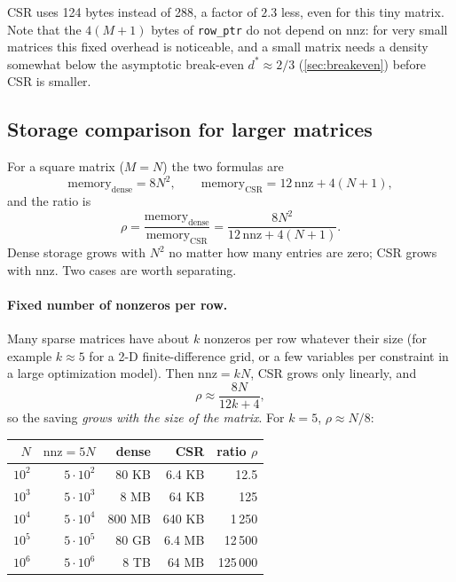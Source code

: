 \documentclass[11pt,a4paper]{article}
\newcommand{\id}[1]{\texttt{#1}}
\newcommand{\nnz}{\mathrm{nnz}}
\begin{document}
\noindent CSR uses 124 bytes instead of 288, a factor of $2.3$ less, even for
this tiny matrix. Note that the $4(M+1)$ bytes of \id{row\_ptr} do not depend
on $\nnz$: for very small matrices this fixed overhead is noticeable, and a
small matrix needs a density somewhat below the asymptotic break-even
$d^* \approx 2/3$ (\cref{sec:breakeven}) before CSR is smaller.

\subsection{Storage comparison for larger matrices}
\label{sec:storage-comparison}

For a square matrix ($M = N$) the two formulas are
\[
  \text{memory}_{\text{dense}} = 8N^2,
  \qquad
  \text{memory}_{\text{CSR}} = 12\,\nnz + 4(N+1),
\]
and the ratio is
\[
  \rho = \frac{\text{memory}_{\text{dense}}}{\text{memory}_{\text{CSR}}}
       = \frac{8N^2}{12\,\nnz + 4(N+1)} .
\]
Dense storage grows with $N^2$ no matter how many entries are zero; CSR grows
with $\nnz$. Two cases are worth separating.

\paragraph{Fixed number of nonzeros per row.}
Many sparse matrices have about $k$ nonzeros per row whatever their size
(for example $k \approx 5$ for a 2-D finite-difference grid, or a few
variables per constraint in a large optimization model). Then
$\nnz = kN$, CSR grows only linearly, and
\[
  \rho \approx \frac{8N}{12k + 4},
\]
so the saving \emph{grows with the size of the matrix}. For $k = 5$,
$\rho \approx N/8$:

\begin{center}
\begin{tabular}{rrrrr}
\toprule
$N$ & $\nnz = 5N$ & dense & CSR & ratio $\rho$ \\
\midrule
$10^2$ & $5 \cdot 10^2$ & 80 KB & 6.4 KB & 12.5 \\
$10^3$ & $5 \cdot 10^3$ & 8 MB & 64 KB & 125 \\
$10^4$ & $5 \cdot 10^4$ & 800 MB & 640 KB & 1\,250 \\
$10^5$ & $5 \cdot 10^5$ & 80 GB & 6.4 MB & 12\,500 \\
$10^6$ & $5 \cdot 10^6$ & 8 TB & 64 MB & 125\,000 \\
\bottomrule
\end{tabular}
\end{center}
\end{document}
